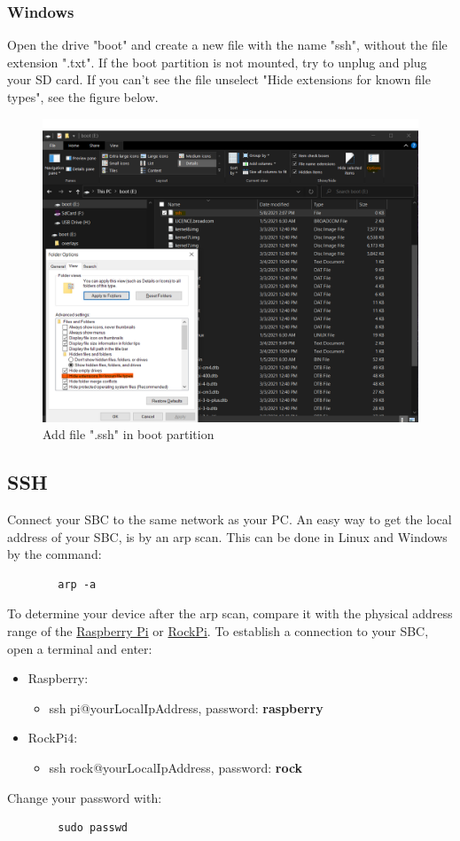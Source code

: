 \documentclass[a4paper,12pt]{article}
\begin{document}
	\subsubsection{Windows}
	Open the drive "boot" and create a new file with the name "ssh", without the file extension ".txt". If the boot partition is not mounted, try to unplug and plug your SD card. If you can't see the file unselect "Hide extensions for known file types", see the figure below. 
	\begin{figure}[H]
		\centering
		\includegraphics[width=0.7\linewidth]{images/WindowsAddSSHFile.png}
		\caption{Add file ".ssh" in boot partition}
		\label{fig:WindowsAddSSHFile}
	\end{figure}
	\subsection{SSH}
	Connect your SBC to the same network as your PC.
	An easy way to get the local address of your SBC, is by an arp scan. This can be done in Linux and Windows by the command:
	\begin{verbatim}
		arp -a
	\end{verbatim}
	To determine your device after the arp scan, compare it with the physical address range of the  \href{https://udger.com/resources/mac-address-vendor-detail?name=raspberry_pi_foundation}{Raspberry Pi} or \href{https://udger.com/resources/mac-address-vendor-detail?name=realtek_semiconductor_corp}{RockPi}.
	To establish a connection to your SBC, open a terminal and enter:
	\begin{itemize}
		\item Raspberry:
		\begin{itemize}
			\item ssh pi@yourLocalIpAddress, password: \textbf{raspberry}
		\end{itemize}
		\item RockPi4: 
		\begin{itemize}
			\item ssh rock@yourLocalIpAddress, password: \textbf{rock}
		\end{itemize}
	\end{itemize}
	Change your password with:
	\begin{verbatim}
		sudo passwd
	\end{verbatim}
\end{document}
